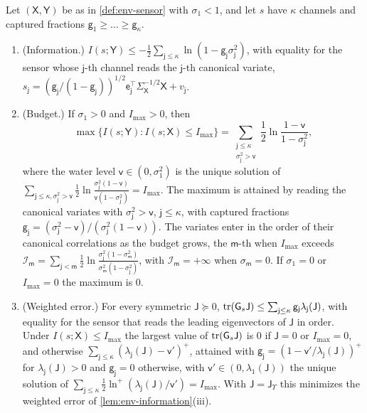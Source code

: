 \begin{theorem}\label{thm:env-canonical}
Let $(\mathsf X,\mathsf Y)$ be as in \cref{def:env-sensor} with $\sigma_1<1$, and let $s$ have $\kappa$ channels and captured fractions $\mathsf g_1\ge\dots\ge\mathsf g_\kappa$.
\begin{enumerate}
\item[(a)] (Information.) $I(s;\mathsf Y)\le-\frac12\sum_{\mathsf j\le\kappa}\ln(1-\mathsf g_{\mathsf j}\sigma_{\mathsf j}^2)$, with equality for the sensor whose $\mathsf j$-th channel reads the $\mathsf j$-th canonical variate, $s_{\mathsf j}=(\mathsf g_{\mathsf j}/(1-\mathsf g_{\mathsf j}))^{1/2}\mathsf e_{\mathsf j}^\top\Sigma_{\mathsf X}^{-1/2}\mathsf X+v_{\mathsf j}$.
\item[(b)] (Budget.) If $\sigma_1>0$ and $I_{\max}>0$, then
\[
\max\bigl\{I(s;\mathsf Y):I(s;\mathsf X)\le I_{\max}\bigr\}=\sum_{\substack{\mathsf j\le\kappa\\\sigma_{\mathsf j}^2>\mathsf v}}\frac12\ln\frac{1-\mathsf v}{1-\sigma_{\mathsf j}^2},
\]
where the water level $\mathsf v\in(0,\sigma_1^2)$ is the unique solution of $\sum_{\mathsf j\le\kappa,\sigma_{\mathsf j}^2>\mathsf v}\frac12\ln\frac{\sigma_{\mathsf j}^2(1-\mathsf v)}{\mathsf v(1-\sigma_{\mathsf j}^2)}=I_{\max}$. The maximum is attained by reading the canonical variates with $\sigma_{\mathsf j}^2>\mathsf v$, $\mathsf j\le\kappa$, with captured fractions $\mathsf g_{\mathsf j}=(\sigma_{\mathsf j}^2-\mathsf v)/(\sigma_{\mathsf j}^2(1-\mathsf v))$. The variates enter in the order of their canonical correlations as the budget grows, the $\mathsf m$-th when $I_{\max}$ exceeds $\mathcal I_{\mathsf m}=\sum_{\mathsf j<\mathsf m}\frac12\ln\frac{\sigma_{\mathsf j}^2(1-\sigma_{\mathsf m}^2)}{\sigma_{\mathsf m}^2(1-\sigma_{\mathsf j}^2)}$, with $\mathcal I_{\mathsf m}=+\infty$ when $\sigma_{\mathsf m}=0$. If $\sigma_1=0$ or $I_{\max}=0$ the maximum is $0$.
\item[(c)] (Weighted error.) For every symmetric $\mathsf J\succeq0$, $\operatorname{tr}(\mathsf G_s\mathsf J)\le\sum_{\mathsf j\le\kappa}\mathsf g_{\mathsf j}\lambda_{\mathsf j}(\mathsf J)$, with equality for the sensor that reads the leading eigenvectors of $\mathsf J$ in order. Under $I(s;\mathsf X)\le I_{\max}$ the largest value of $\operatorname{tr}(\mathsf G_s\mathsf J)$ is $0$ if $\mathsf J=0$ or $I_{\max}=0$, and otherwise $\sum_{\mathsf j\le\kappa}(\lambda_{\mathsf j}(\mathsf J)-\mathsf v')^+$, attained with $\mathsf g_{\mathsf j}=(1-\mathsf v'/\lambda_{\mathsf j}(\mathsf J))^+$ for $\lambda_{\mathsf j}(\mathsf J)>0$ and $\mathsf g_{\mathsf j}=0$ otherwise, with $\mathsf v'\in(0,\lambda_1(\mathsf J))$ the unique solution of $\sum_{\mathsf j\le\kappa}\frac12\ln^+(\lambda_{\mathsf j}(\mathsf J)/\mathsf v')=I_{\max}$. With $\mathsf J=\mathsf J_\Upsilon$ this minimizes the weighted error of \cref{lem:env-information}(iii).

\end{enumerate}
\end{theorem}
